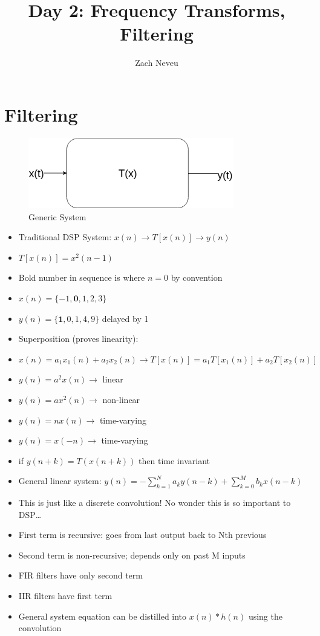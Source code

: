 \documentclass[12pt, letter]{article}
\author{Zach Neveu}
\title{ Day 2: Frequency Transforms, Filtering }
\begin{document}
\maketitle

\section{Filtering}%
\label{sec:filtering}

\begin{figure}[h]
	\centering
	\includegraphics[width=0.8\textwidth]{lin-sys}
	\caption{Generic System}
	\label{fig:lin-sys}
\end{figure}
\begin{itemize}
	\item Traditional DSP System: $x(n) \to T[x(n)] \to y(n)$
	\item $T[x(n)] = x^2(n-1)$ 
	\item Bold number in sequence is where $n=0$ by convention
	\item $x(n) = \{-1, \mathbf{0}, 1, 2, 3\}$
	\item $y(n) = \{\mathbf{1}, 0, 1, 4, 9\}$ delayed by 1
	\item Superposition (proves linearity):
	\item $x(n) = a_1x_1(n)+a_2x_2(n) \to T[x(n)] = a_1T[x_1(n)]+a_2T[x_2(n)]$ 
	\item $y(n) = a^2 x(n) \to $ linear
	\item $y(n) = ax^2(n) \to$ non-linear
	\item $y(n) = nx(n) \to$ time-varying
	\item $y(n) = x(-n) \to$ time-varying
	\item if $y(n+k) = T(x(n+k))$ then time invariant
	\item General linear system: $y(n) = - \sum_{k=1}^{N} a_ky(n-k) + \sum_{k=0}^{M} b_kx(n-k)$
	\item This is just like a discrete convolution! No wonder this is so important to DSP\ldots
	\item First term is recursive: goes from last output back to Nth previous
	\item Second term is non-recursive; depends only on past M inputs
	\item FIR filters have only second term
	\item IIR filters have first term
	\item General system equation can be distilled into $x(n)*h(n)$ using the convolution
\end{itemize}
\end{document}
